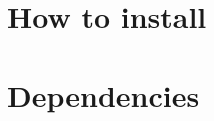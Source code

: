 \documentclass[a4paper,10pt,english]{sphinxmanual}
\begin{document}
\section{How to install}
\label{\detokenize{getting_started/introduction:how-to-install}}
\begin{sphinxVerbatim}[commandchars=\\\{\}]
  
\end{sphinxVerbatim}


\section{Dependencies}
\label{\detokenize{getting_started/introduction:dependencies}}
\begin{sphinxVerbatim}[commandchars=\\\{\}]

\end{sphinxVerbatim}
\end{document}
